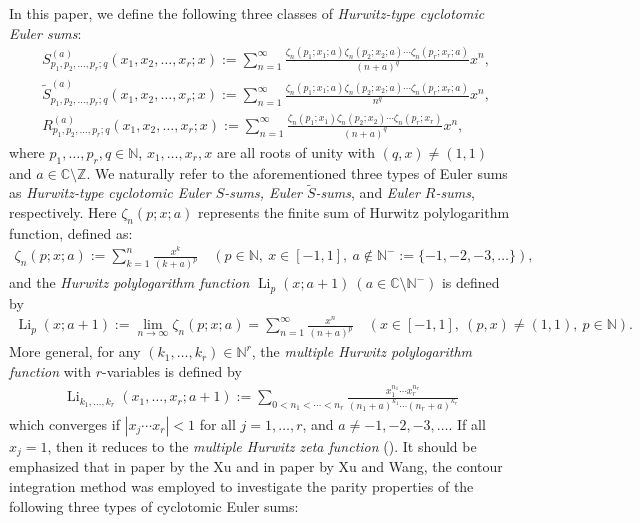 \documentclass[11pt]{article}
\DeclareMathOperator{\Li}{Li}
\def\N{\mathbb{N}}
\def\Z{\mathbb{Z}}
\theoremstyle{plain}
\theoremstyle{definition}
\begin{document}
In this paper, we define the following three classes of \emph{Hurwitz-type cyclotomic Euler sums}:
\begin{align}
&S^{(a)}_{p_1,p_2,\ldots,p_r;q}(x_1,x_2,\ldots,x_r;x):=\sum_{n=1}^\infty \frac{\zeta_{n}(p_1;x_1;a)\zeta_{n}(p_2;x_2;a)\cdots \zeta_{n}(p_r;x_r;a)}{(n+a)^q}x^n,\label{defnS-ES1}\\
&\tilde{S}^{(a)}_{p_1,p_2,\ldots,p_r;q}(x_1,x_2,\ldots,x_r;x):=\sum_{n=1}^\infty \frac{\zeta_{n}(p_1;x_1;a)\zeta_{n}(p_2;x_2;a)\cdots \zeta_{n}(p_r;x_r;a)}{n^q}x^n,\label{defnS-ES2}\\
&R^{(a)}_{p_1,p_2,\ldots,p_r;q}(x_1,x_2,\ldots,x_r;x):=\sum_{n=1}^\infty \frac{\zeta_{n}(p_1;x_1)\zeta_{n}(p_2;x_2)\cdots \zeta_{n}(p_r;x_r)}{(n+a)^q}x^n,\label{defnS-ES3}
\end{align}
where $p_1,\ldots,p_r,q\in \N$, $x_1,\ldots,x_r,x$ are all roots of unity with $(q,x)\neq (1,1)$ and $a\in \mathbb{C}\setminus \Z$. We naturally refer to the aforementioned three types of Euler sums as \emph{Hurwitz-type cyclotomic Euler $S$-sums, Euler $\tilde{S}$-sums}, and \emph{Euler $R$-sums}, respectively.
Here $\zeta_n(p;x;a)$ represents the finite sum of Hurwitz polylogarithm function, defined as:
\begin{align}
\zeta_n(p;x;a):=\sum_{k=1}^n \frac{x^k}{(k+a)^p}\quad (p\in \N,\ x\in [-1,1],\ a\notin\N^{-}:=\{-1,-2,-3,\ldots\}),
\end{align}
and the \emph{Hurwitz polylogarithm function} $\Li_p(x;a+1)\ (a\in \mathbb{C}\setminus \N^-)$ is defined by
\begin{align}
\Li_{p}(x;a+1):=\lim_{n\rightarrow \infty}\zeta_n(p;x;a)= \sum_{n=1}^\infty \frac{x^n}{(n+a)^p}\quad (x\in[-1,1],\ (p,x)\neq (1,1),\ p\in \N).
\end{align}
More general, for any $(k_1,\dotsc,k_r)\in\N^r$, the  \emph{multiple Hurwitz polylogarithm function} with $r$-variables is defined by
\begin{align}\label{defn-mpolyf}
\Li_{k_1,\dotsc,k_r}(x_1,\dotsc,x_r;a+1):=\sum_{0<n_1<\cdots<n_r} \frac{x_1^{n_1}\dotsm x_r^{n_r}}{(n_1+a)^{k_1}\dotsm (n_r+a)^{k_r}}
\end{align}
which converges if $|x_j\cdots x_r|<1$ for all $j=1,\dotsc,r$, and $a\neq -1,-2,-3,\ldots$. If all $x_j = 1$, then it reduces to the \emph{multiple Hurwitz zeta function} (\cite{AkiyamaIshikawa,MXY2021}). It should be emphasized that in paper \cite{XC2025} by the Xu and in paper \cite{Wang-Xu2025} by Xu and Wang, the contour integration method was employed to investigate the parity properties of the following three types of cyclotomic Euler sums:
\end{document}
